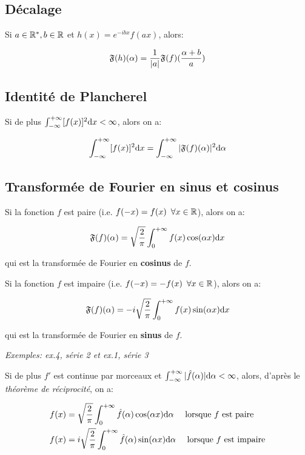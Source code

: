 \subsection{Décalage}

Si $a \in \mathbb{R}^*, b \in \mathbb{R}$ et $h(x) = e^{-ibx}f(ax)$, alors:

\[\mathfrak{F}(h)(\alpha) = \frac{1}{|a|} \mathfrak{F}(f)(\frac{\alpha + b}{a})\]


\subsection{Identité de Plancherel}

Si de plus $\int_{-\infty}^{+\infty} [f(x)]^2 \mathrm{d}x < \infty$, alors on a:

\[\int_{-\infty}^{+\infty} [f(x)]^2 \mathrm{d}x = \int_{-\infty}^{+\infty} |\mathfrak{F}(f)(\alpha)|^2 \mathrm{d}\alpha\]


\subsection{Transformée de Fourier en sinus et cosinus}

Si la fonction $f$ est paire (i.e. $f(-x) = f(x) \enspace \forall x \in \mathbb{R}$), alors on a:

\[
\mathfrak{F}(f)(\alpha) =
\sqrt{\frac{2}{\pi}}
\int_{0}^{+\infty} f(x)\cos(\alpha x) \mathrm{d}x
\]

qui est la transformée de Fourier en \textbf{cosinus} de $f$.

Si la fonction $f$ est impaire (i.e. $f(-x) = -f(x) \enspace \forall x \in \mathbb{R}$), alors on a:

\[
\mathfrak{F}(f)(\alpha) =
- i
\sqrt{\frac{2}{\pi}}
\int_{0}^{+\infty} f(x)\sin(\alpha x) \mathrm{d}x
\]

qui est la transformée de Fourier en \textbf{sinus} de $f$.

\textit{Exemples: ex.4, série 2 et ex.1, série 3}

\begin{remark}
    Si de plus $f'$ est continue par morceaux et $\int_{-\infty}^{+\infty} |\hat{f}(\alpha)| \mathrm{d}\alpha < \infty$, alors, d'après le \textit{théorème de réciprocité}, on a:
    
    \begin{align*}
    f(x) &=
    \sqrt{\frac{2}{\pi}}
    \int_{0}^{+\infty} \hat{f}(\alpha)\cos(\alpha x) \mathrm{d}\alpha
    \quad
    \textrm{ lorsque } f \textrm{ est paire}\\
    f(x) &=
    i
    \sqrt{\frac{2}{\pi}}
    \int_{0}^{+\infty} \hat{f}(\alpha)\sin(\alpha x) \mathrm{d}\alpha
    \quad
    \textrm{ lorsque } f \textrm{ est impaire}\\
    \end{align*}
\end{remark}
